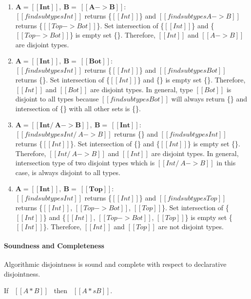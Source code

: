 \begin{enumerate}
  \item $\boldsymbol{A = [[Int]], \ B = \ [[A -> B]]:}$ \\
        $[[findsubtypes Int]]$ returns \{$[[Int]]$\} and $[[findsubtypes A -> B]]$ returns
        \{$[[Top -> Bot]]$\}. Set intersection of \{$[[Int]]$\} and \{$[[Top -> Bot]]$\} is
        empty set \{\}. Therefore, $[[Int]]$ and $[[A -> B]]$ are disjoint types.
  \item $\boldsymbol{A = [[Int]], \ B = \ [[Bot]]:}$ \\
        $[[findsubtypes Int]]$ returns \{$[[Int]]$\} and $[[findsubtypes Bot]]$ returns
        \{\}. Set intersection of \{$[[Int]]$\} and \{\} is
        empty set \{\}. Therefore, $[[Int]]$ and $[[Bot]]$ are disjoint types.
        In general, type $[[Bot]]$ is disjoint to all types because $[[findsubtypes Bot]]$
        will always return \{\} and intersection of \{\} with all other sets is \{\}.
  \item $\boldsymbol{A = [[Int /\ A -> B]], \ B = \ [[Int]]:}$ \\
        $[[findsubtypes Int /\ A -> B]]$ returns \{\} and $[[findsubtypes Int]]$ returns
        \{$[[Int]]$\}. Set intersection of \{\} and \{$[[Int]]$\} is
        empty set \{\}. Therefore, $[[Int /\ A -> B]]$ and $[[Int]]$ are disjoint types.
        In general, intersection type of two disjoint types which is $[[Int /\ A -> B]]$ in this case,
        is always disjoint to all types.
  \item $\boldsymbol{A = [[Int]], \ B = \ [[Top]]:}$ \\
        $[[findsubtypes Int]]$ returns \{$[[Int]]$\} and $[[findsubtypes Top]]$ returns
        \{$[[Int]]$, $[[Top -> Bot]]$, $[[Top]]$\}.
        Set intersection of \{$[[Int]]$\} and \{$[[Int]]$, $[[Top -> Bot]]$, $[[Top]]$\} is
        empty set \{$[[Int]]$\}. Therefore, $[[Int]]$ and $[[Top]]$ are not disjoint types.
\end{enumerate}

\paragraph{Soundness and Completeness}
Algorithmic disjointness is sound and complete with respect to declarative disjointness.

\begin{lemma}
  If \ $[[A * B]]$ \ then \ $[[A *s B]]$.
\label{lemma:inter:disj-sound}
\end{lemma}

